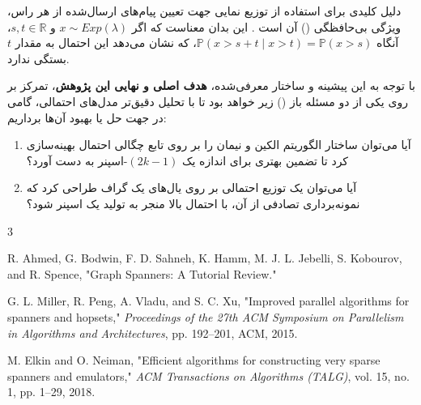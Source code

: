 \documentclass[12pt,a4paper]{article}
\begin{document}
دلیل کلیدی برای استفاده از توزیع نمایی جهت تعیین پیام‌های ارسال‌شده از هر راس، ویژگی بی‌حافظگی () آن است \cite{elkin}. این بدان معناست که اگر $x \sim Exp(\lambda)$ و $s, t \in \mathbb{R}$، آنگاه $\mathbb{P}(x > s+t \mid x > t) = \mathbb{P}(x > s)$، که نشان می‌دهد این احتمال به مقدار $t$ بستگی ندارد.

با توجه به این پیشینه و ساختار معرفی‌شده، \textbf{هدف اصلی و نهایی این پژوهش}، تمرکز بر روی یکی از دو مسئله باز () زیر خواهد بود تا با تحلیل دقیق‌تر مدل‌های احتمالی، گامی در جهت حل یا بهبود آن‌ها برداریم:
\begin{enumerate}
    \item آیا می‌توان ساختار الگوریتم الکین و نیمان را بر روی تابع چگالی احتمال بهینه‌سازی کرد تا تضمین بهتری برای اندازه یک $(2k - 1)$-اسپنر به دست آورد؟
    \item آیا می‌توان یک توزیع احتمالی بر روی یال‌های یک گراف طراحی کرد که نمونه‌برداری تصادفی از آن، با احتمال بالا منجر به تولید یک اسپنر شود؟
\end{enumerate}

\newpage
\begin{thebibliography}{3}
\baselineskip=6mm
\begin{LTRbibitems}
\resetlatinfont
{}
R. Ahmed, G. Bodwin, F. D. Sahneh, K. Hamm, M. J. L. Jebelli, S. Kobourov, and R. Spence, "Graph Spanners: A Tutorial Review."

G. L. Miller, R. Peng, A. Vladu, and S. C. Xu, "Improved parallel algorithms for spanners and hopsets," \textit{Proceedings of the 27th ACM Symposium on Parallelism in Algorithms and Architectures}, pp. 192--201, ACM, 2015.

M. Elkin and O. Neiman, "Efficient algorithms for constructing very sparse spanners and emulators," \textit{ACM Transactions on Algorithms (TALG)}, vol. 15, no. 1, pp. 1--29, 2018.
\end{LTRbibitems}
\end{thebibliography}
\end{document}
